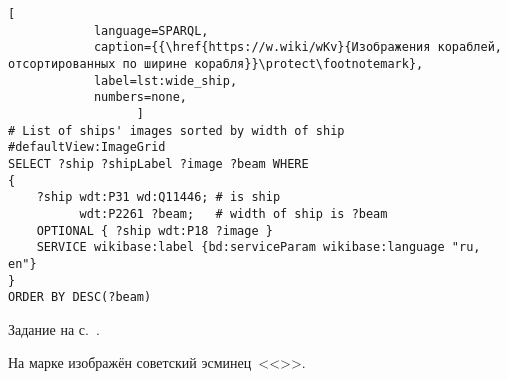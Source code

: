 \begin{task}
\newpage
\begin{lstlisting}[ 
            language=SPARQL, 
            caption={{\href{https://w.wiki/wKv}{Изображения кораблей, отсортированных по ширине корабля}}\protect\footnotemark}, 
            label=lst:wide_ship, 
            numbers=none,
                  ]
# List of ships' images sorted by width of ship
#defaultView:ImageGrid
SELECT ?ship ?shipLabel ?image ?beam WHERE 
{
    ?ship wdt:P31 wd:Q11446; # is ship
          wdt:P2261 ?beam;   # width of ship is ?beam
    OPTIONAL { ?ship wdt:P18 ?image }
    SERVICE wikibase:label {bd:serviceParam wikibase:language "ru, en"}
}
ORDER BY DESC(?beam)
\end{lstlisting}
\end{task}




\begin{task}
    \label{answer:ship_stamp}
    \AnswerBackref Задание на с.~\pageref{question:ship_stamp}.

    На марке изображён советский эсминец~<<>>.
\end{task}




